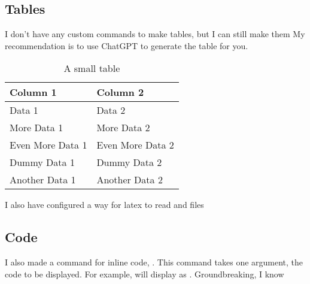 \subsection{Tables}

I don't have any custom commands to make tables, but I can still make them My recommendation is to use ChatGPT to generate the table for you.
\begin{table}[h!]
    \centering
    \begin{tabular}{ll}
        \toprule
        \textbf{Column 1} & \textbf{Column 2} \\
        \midrule
        Data 1 & Data 2 \\
        More Data 1 & More Data 2 \\
        Even More Data 1 & Even More Data 2 \\
        Dummy Data 1 & Dummy Data 2 \\
        Another Data 1 & Another Data 2 \\
        \bottomrule
    \end{tabular}
    \caption{A small table}
    \label{tab:dummy}
\end{table}

I also have configured a way for latex to read  and  files

\subsection{Code}

I also made a command for inline code, \code{\code{}}. This command takes one argument, the code to be displayed. For example,  will display as . Groundbreaking, I know 


